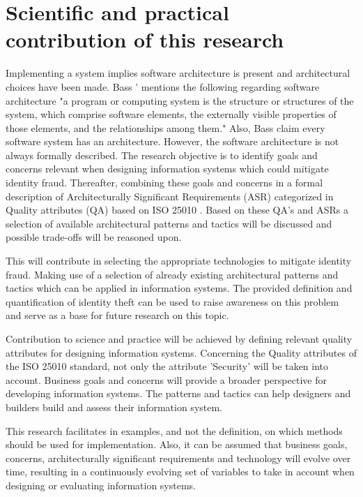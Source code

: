 \section{Scientific and practical contribution of this research}
Implementing a system implies software architecture is present and architectural choices have been made. Bass '\etal \cite{Bass2015SoftwareAI} mentions the following regarding software architecture "a program or computing system is the structure or structures of the system, which comprise software elements, the externally visible properties of those elements, and the relationships among them." Also, Bass \etal claim every software system has an architecture. However, the software architecture is not always formally described.
The research objective is to identify goals and concerns relevant when designing information systems which could mitigate identity fraud. Thereafter, combining these goals and concerns in a formal description of Architecturally Significant Requirements (ASR) categorized in Quality attributes (QA) based on ISO 25010 \cite{ISO:25010:2011}. Based on these QA's and ASRs a selection of available architectural patterns and tactics will be discussed and possible trade-offs will be reasoned upon.

This will contribute in selecting the appropriate technologies to mitigate identity fraud. Making use of a selection of already existing architectural patterns and tactics which can be applied in information systems. The provided definition and quantification of identity theft can be used to raise awareness on this problem and serve as a base for future research on this topic.

Contribution to science and practice will be achieved by defining relevant quality attributes for designing information systems. Concerning the Quality attributes of the ISO 25010 standard, not only the attribute 'Security' will be taken into account. Business goals and concerns will provide a broader perspective for developing information systems. The patterns and tactics can help designers and builders build and assess their information system.

This research facilitates in examples, and not the definition, on which methods should be used for implementation. Also, it can be assumed that business goals, concerns, architecturally significant requirements and technology will evolve over time, resulting in a continuously evolving set of variables to take in account when designing or evaluating information systems.